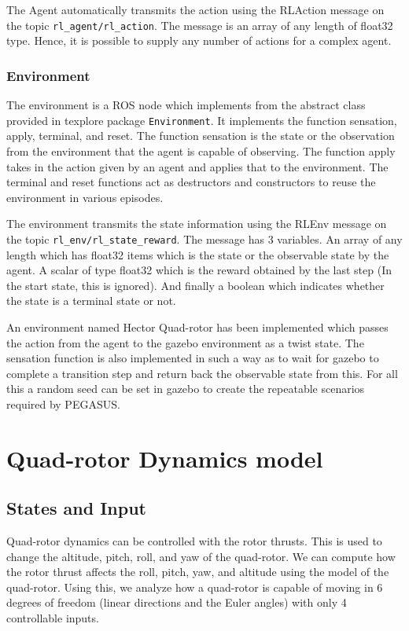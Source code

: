 \documentclass[hidelinks,BTech]{iitmdiss}
\begin{document}
The Agent automatically transmits the action using the RLAction message on the topic \texttt{rl\_agent/rl\_action}. The message is an array of any length of float32 type. Hence, it is possible to supply any number of actions for a complex agent.

\subsection*{Environment}

The environment is a ROS node which implements from the abstract class provided in texplore package \texttt{Environment}. It implements the function sensation, apply, terminal, and reset. The function sensation is the state or the observation from the environment that the agent is capable of observing. The function apply takes in the action given by an agent and applies that to the environment. The terminal and reset functions act as destructors and constructors to reuse the environment in various episodes.

The environment transmits the state information using the RLEnv message on the topic \texttt{rl\_env/rl\_state\_reward}. The message has 3 variables. An array of any length which has float32 items which is the state or the observable state by the agent. A scalar of type float32 which is the reward obtained by the last step (In the start state, this is ignored). And finally a boolean which indicates whether the state is a terminal state or not.

An environment named Hector Quad-rotor has been implemented which passes the action from the agent to the gazebo environment as a twist state. The sensation function is also implemented in such a way as to wait for gazebo to complete a transition step and return back the observable state from this. For all this a random seed can be set in gazebo to create the repeatable scenarios required by PEGASUS.

\chapter{Quad-rotor Dynamics model}

\section{States and Input}
Quad-rotor dynamics can be controlled with the rotor thrusts. This is used to change the altitude, pitch, roll, and yaw of the quad-rotor. We can compute how the rotor thrust affects the roll, pitch, yaw, and altitude using the model of the quad-rotor. Using this, we analyze how a quad-rotor is capable of moving in 6 degrees of freedom (linear directions and the Euler angles) with only 4 controllable inputs.
\end{document}
